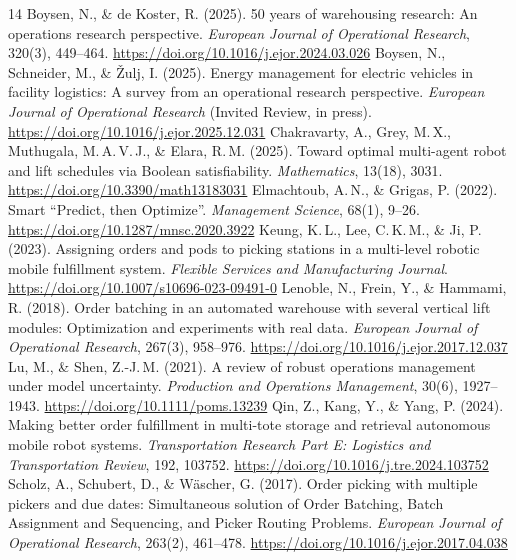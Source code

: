 \documentclass[11pt, a4paper]{article}
\begin{document}
\begin{thebibliography}{14}
   Boysen, N., \& de Koster, R. (2025). 50 years of warehousing research: An operations research perspective. \emph{European Journal of Operational Research}, 320(3), 449--464. \url{https://doi.org/10.1016/j.ejor.2024.03.026}
   Boysen, N., Schneider, M., \& \v{Z}ulj, I. (2025). Energy management for electric vehicles in facility logistics: A survey from an operational research perspective. \emph{European Journal of Operational Research} (Invited Review, in press). \url{https://doi.org/10.1016/j.ejor.2025.12.031}
   Chakravarty, A., Grey, M.\,X., Muthugala, M.\,A.\,V.\,J., \& Elara, R.\,M. (2025). Toward optimal multi-agent robot and lift schedules via Boolean satisfiability. \emph{Mathematics}, 13(18), 3031. \url{https://doi.org/10.3390/math13183031}
   Elmachtoub, A.\,N., \& Grigas, P. (2022). Smart ``Predict, then Optimize''. \emph{Management Science}, 68(1), 9--26. \url{https://doi.org/10.1287/mnsc.2020.3922}
   Keung, K.\,L., Lee, C.\,K.\,M., \& Ji, P. (2023). Assigning orders and pods to picking stations in a multi-level robotic mobile fulfillment system. \emph{Flexible Services and Manufacturing Journal}. \url{https://doi.org/10.1007/s10696-023-09491-0}
   Lenoble, N., Frein, Y., \& Hammami, R. (2018). Order batching in an automated warehouse with several vertical lift modules: Optimization and experiments with real data. \emph{European Journal of Operational Research}, 267(3), 958--976. \url{https://doi.org/10.1016/j.ejor.2017.12.037}
   Lu, M., \& Shen, Z.-J.\,M. (2021). A review of robust operations management under model uncertainty. \emph{Production and Operations Management}, 30(6), 1927--1943. \url{https://doi.org/10.1111/poms.13239}
   Qin, Z., Kang, Y., \& Yang, P. (2024). Making better order fulfillment in multi-tote storage and retrieval autonomous mobile robot systems. \emph{Transportation Research Part E: Logistics and Transportation Review}, 192, 103752. \url{https://doi.org/10.1016/j.tre.2024.103752}
   Scholz, A., Schubert, D., \& W\"ascher, G. (2017). Order picking with multiple pickers and due dates: Simultaneous solution of Order Batching, Batch Assignment and Sequencing, and Picker Routing Problems. \emph{European Journal of Operational Research}, 263(2), 461--478. \url{https://doi.org/10.1016/j.ejor.2017.04.038}

\end{thebibliography}
\end{document}
